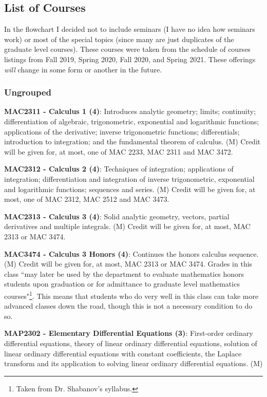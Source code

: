 \documentclass[11pt]{article}
\begin{document}
\subsection{List of Courses}

In the flowchart I decided not to include seminars (I have no idea how seminars work) or most of the special topics (since many are just duplicates of the graduate level courses). These courses were taken from the schedule of courses listings from Fall 2019, Spring 2020, Fall 2020, and Spring 2021. These offerings \textit{will} change in some form or another in the future.

\subsubsection{\colorbox{white}{Ungrouped}}

\textbf{MAC2311 - Calculus 1 (4)}: Introduces analytic geometry; limits; continuity; differentiation of algebraic, trigonometric, exponential and logarithmic functions; applications of the derivative; inverse trigonometric functions; differentials; introduction to integration; and the fundamental theorem of calculus. (M) Credit will be given for, at most, one of MAC 2233, MAC 2311 and MAC 3472.

\textbf{MAC2312 - Calculus 2 (4)}: Techniques of integration; applications of integration; differentiation and integration of inverse trigonometric, exponential and logarithmic functions; sequences and series. (M) Credit will be given for, at most, one of MAC 2312, MAC 2512 and MAC 3473.

\textbf{MAC2313 - Calculus 3 (4)}: Solid analytic geometry, vectors, partial derivatives and multiple integrals. (M) Credit will be given for, at most, MAC 2313 or MAC 3474.

\textbf{MAC3474 - Calculus 3 Honors (4)}: Continues the honors calculus sequence. (M) Credit will be given for, at most, MAC 2313 or MAC 3474. Grades in this class ``may later be used by the department to evaluate mathematics honors students upon graduation or for admittance to graduate level mathematics courses"\footnote{Taken from Dr. Shabanov's syllabus.}. This means that students who do very well in this class can take more advanced classes down the road, though this is not a necessary condition to do so.

\textbf{MAP2302 - Elementary Differential Equations (3)}: First-order ordinary differential equations, theory of linear ordinary differential equations, solution of linear ordinary differential equations with constant coefficients, the Laplace transform and its application to solving linear ordinary differential equations. (M)
\end{document}
